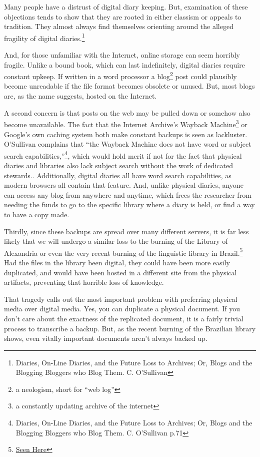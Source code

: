 \documentclass[12pt]{article}[titlepage]
\newcommand{\say}[1]{``#1''}
\newcommand{\1}{\={a}}
\newcommand{\2}{\={e}}
\newcommand{\3}{\={\i}}
\newcommand{\4}{\=o}
\newcommand{\5}{\=u}
\newcommand{\6}{\={A}}
\renewcommand{\,}{\textsuperscript{,}}
\begin{document}
Many people have a distrust of digital diary keeping.
But, examination of these objections tends to show that they are rooted in either classism or appeals to tradition.
They almost always find themselves orienting around the alleged fragility of digital diaries.\footnote{Diaries, On-Line Diaries, and the Future Loss to Archives; Or, Blogs and the Blogging Bloggers who Blog Them. C. O’Sullivan}

And, for those unfamiliar with the Internet, online storage can seem horribly fragile.
Unlike a bound book, which can last indefinitely, digital diaries require constant upkeep.
If written in a word processor a blog\footnote{a neologism, short for \say{web log}} post could plausibly become unreadable if the file format becomes obsolete or unused.
But, most blogs are, as the name suggests, hosted on the Internet.

A second concern is that posts on the web may be pulled down or somehow also become unavailable.
The fact that the Internet Archive’s Wayback Machine\footnote{a constantly updating archive of the internet} or Google’s own caching system both make constant backups is seen as lackluster.
O’Sullivan complains that \say{the Wayback Machine does not have word or subject search capabilities,}\footnote{Diaries, On-Line Diaries, and the Future Loss to Archives; Or, Blogs and the Blogging Bloggers who Blog Them. C. O’Sullivan p.71}, which would hold merit if not for the fact that physical diaries and libraries also lack subject search without the work of dedicated stewards..
Additionally, digital diaries all have word search capabilities, as modern browsers all contain that feature.
And, unlike physical diaries, anyone can access any blog from anywhere and anytime, which frees the researcher from needing the funds to go to the specific library where a diary is held, or find a way to have a copy made.

Thirdly, since these backups are spread over many different servers, it is far less likely that we will undergo a similar loss to the burning of the Library of Alexandria or even the very recent burning of the linguistic library in Brazil.\footnote{\href{https://www.nationalgeographic.com/science/2018/09/news-museu-nacional-fire-rio-de-janeiro-natural-history/}{Seen Here}}
Had the files in the library been digital, they could have been more easily duplicated, and would have been hosted in a different site from the physical artifacts, preventing that horrible loss of knowledge.

That tragedy calls out the most important problem with preferring physical media over digital media.
Yes, you can duplicate a physical document.
If you don’t care about the exactness of the replicated document, it is a fairly trivial process to transcribe a backup.
But, as the recent burning of the Brazilian library shows, even vitally important documents aren’t always backed up.
\end{document}
